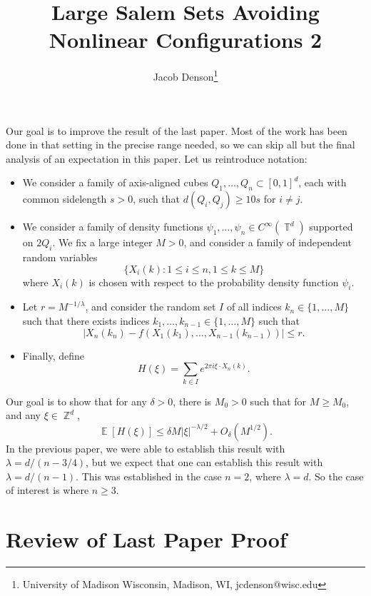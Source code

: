 \documentclass[dvipsnames,letterpaper,12pt]{article}
\title{Large Salem Sets Avoiding Nonlinear Configurations 2}
\author{Jacob Denson\footnote{University of Madison Wisconsin, Madison, WI, jcdenson@wisc.edu}}
\numberwithin{equation}{section}
\DeclareMathOperator{\ZZ}{\mathbb{Z}}
\DeclareMathOperator{\TT}{\mathbb{T}}
\numberwithin{theorem}{section}
\DeclareMathOperator{\EE}{\mathbb{E}}
\begin{document}
\maketitle

Our goal is to improve the result of the last paper. Most of the work has been done in that setting in the precise range needed, so we can skip all but the final analysis of an expectation in this paper. Let us reintroduce notation:
%
\begin{itemize}
    \item We consider a family of axis-aligned cubes $Q_1,\dots,Q_n \subset [0,1]^d$, each with common sidelength $s > 0$, such that $d(Q_i,Q_j) \geq 10s$ for $i \neq j$.

    \item We consider a family of density functions $\psi_1,\dots,\psi_n \in C^\infty(\TT^d)$ supported on $2Q_i$. We fix a large integer $M > 0$, and consider a family of independent random variables
    \[ \{ X_i(k): 1 \leq i \leq n, 1 \leq k \leq M \} \]
    where $X_i(k)$ is chosen with respect to the probability density function $\psi_i$.

    \item Let $r = M^{-1/\lambda}$, and consider the random set $I$ of all indices $k_n \in \{ 1, \dots, M \}$ such that there exists indices $k_1,\dots,k_{n-1} \in \{ 1, \dots, M \}$ such that
    \[ |X_n(k_n) - f(X_1(k_1),\dots,X_{n-1}(k_{n-1}))| \leq r. \]

    \item Finally, define
    \[ H(\xi) = \sum_{k \in I} e^{2 \pi i \xi \cdot X_n(k)}. \]
\end{itemize}
%
Our goal is to show that for any $\delta > 0$, there is $M_0 > 0$ such that for $M \geq M_0$, and any $\xi \in \ZZ^d$,
%
\[ \EE[H(\xi)] \leq \delta M |\xi|^{-\lambda/2} + O_\delta(M^{1/2}). \]
%
In the previous paper, we were able to establish this result with $\lambda = d/(n-3/4)$, but we expect that one can establish this result with $\lambda = d/(n-1)$. This was established in the case $n = 2$, where $\lambda = d$. So the case of interest is where $n \geq 3$.

\section{Review of Last Paper Proof}
\end{document}
